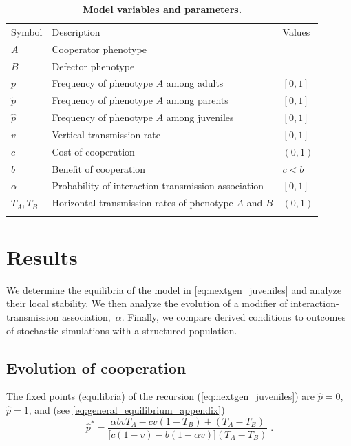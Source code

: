 \documentclass[12pt]{extarticle}
\begin{document}
\begin{table}[h]
\centering
\caption{\textbf{Model variables and parameters.}
}
\begin{tabular}{lll}
\toprule
Symbol & Description & Values \\ \cmidrule(r){1-3}
$A$ & Cooperator phenotype & \\
$B$ & Defector phenotype & \\
$p$ & Frequency of phenotype $A$ among adults & $[0,1]$ \\
$\tilde p$ & Frequency of phenotype $A$ among parents & $[0,1]$ \\
$\hat p$ & Frequency of phenotype $A$ among juveniles & $[0,1]$ \\
$v$ & Vertical transmission rate & $[0,1]$ \\
$c$ & Cost of cooperation & $(0,1)$ \\
$b$ & Benefit of cooperation & $c<b$ \\
$\alpha$ & Probability of interaction-transmission association & $[0,1]$ \\
$T_A, T_B$ & Horizontal transmission rates of phenotype $A$ and $B$ & $(0,1)$ \\
\\ \bottomrule
\end{tabular}
\label{table:vars_params}
\end{table}


\newpage
\section{Results}

We determine the equilibria of the model in \autoref{eq:nextgen_juveniles}
and analyze their local stability.
We then analyze the evolution of a modifier of interaction-transmission association,~$\alpha$.
Finally, we compare derived conditions to outcomes of stochastic simulations with a structured population.

\subsection{Evolution of cooperation}

The fixed points (equilibria) of  the recursion (\autoref{eq:nextgen_juveniles}) are $\hat p=0$, $\hat p=1$, and (see \autoref{eq:general_equilibrium_appendix})
\begin{equation} \label{eq:general_equilibrium}
  \hat{p}^* =  
  \frac{\alpha bvT_A - cv(1-T_B) + (T_A-T_B)}{\big[c(1-v) - b (1-\alpha v)\big] (T_A-T_B)} \;.
\end{equation}
\end{document}
